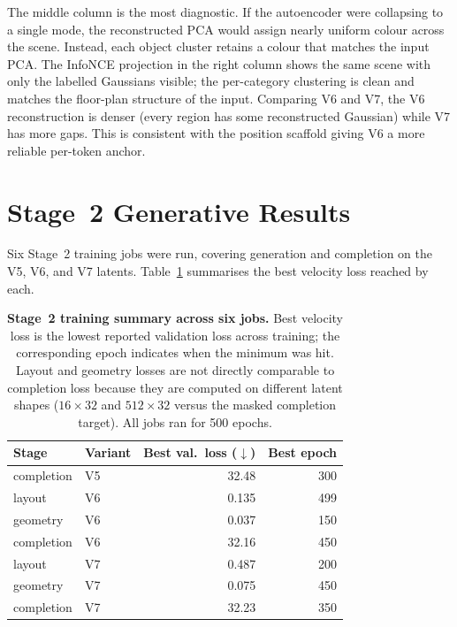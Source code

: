 The middle column is the most diagnostic. If the autoencoder were collapsing to a single mode, the reconstructed PCA would assign nearly uniform colour across the scene. Instead, each object cluster retains a colour that matches the input PCA. The InfoNCE projection in the right column shows the same scene with only the labelled Gaussians visible; the per-category clustering is clean and matches the floor-plan structure of the input. Comparing V6 and V7, the V6 reconstruction is denser (every region has some reconstructed Gaussian) while V7 has more gaps. This is consistent with the position scaffold giving V6 a more reliable per-token anchor.

\section{Stage~2 Generative Results}
\label{sec:results_stage2}

Six Stage~2 training jobs were run, covering generation and completion on the V5, V6, and V7 latents. Table~\ref{tab:stage2_summary} summarises the best velocity loss reached by each.

\begin{table}[h]
  \centering
  \caption[Stage 2 training summary]{\textbf{Stage~2 training summary across six jobs.} Best velocity loss is the lowest reported validation loss across training; the corresponding epoch indicates when the minimum was hit. Layout and geometry losses are not directly comparable to completion loss because they are computed on different latent shapes ($16 \times 32$ and $512 \times 32$ versus the masked completion target). All jobs ran for 500 epochs.}
  \label{tab:stage2_summary}
  {\small
  \begin{tabular}{llrr}
    \toprule
    Stage & Variant & Best val.\ loss ($\downarrow$) & Best epoch \\
    \midrule
    completion & V5  & 32.48  & 300 \\
    layout     & V6  & 0.135  & 499 \\
    geometry   & V6  & 0.037  & 150 \\
    completion & V6  & 32.16  & 450 \\
    layout     & V7  & 0.487  & 200 \\
    geometry   & V7  & 0.075  & 450 \\
    completion & V7  & 32.23  & 350 \\
    \bottomrule
  \end{tabular}}
\end{table}

